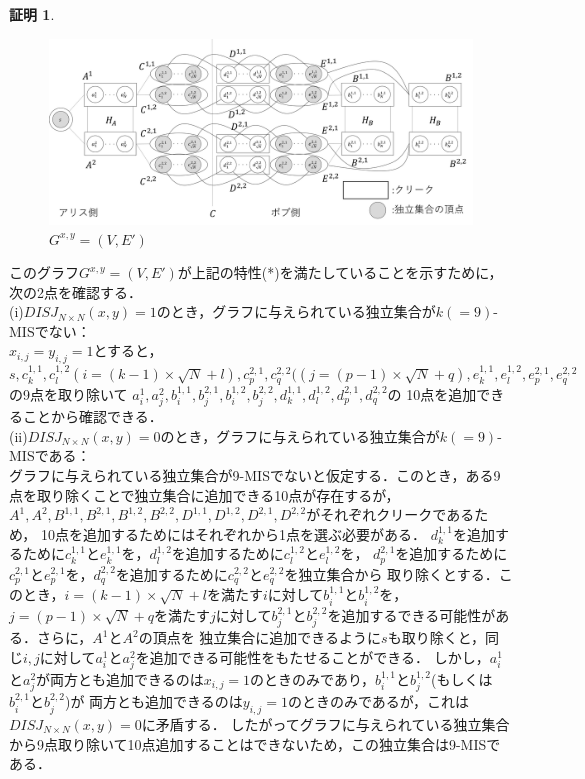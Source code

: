\documentclass[12pt]{thesis}
\theoremstyle{definition}
\newtheorem*{prf*}{証明}
\begin{document}
\begin{prf*}
\begin{figure}[ht]
\begin{center}
\includegraphics[width=120mm]{k_Gxy.png}
\end{center}
\caption{$G^{x, y} = (V, E')$}
\label{k_Gxy}
\end{figure}

このグラフ$G^{x, y} = (V, E')$が上記の特性(*)を満たしていることを示すために，次の2点を確認する． \\
(i)$DISJ_{N \times N} (x, y) = 1$のとき，グラフに与えられている独立集合が$k( = 9)$-MISでない： \\
$x_{i, j} = y_{i, j} =1$とすると，$s, c_{k}^{1,1}, c_{l}^{1,2}(i = (k - 1) \times \sqrt{N} + l),
 c_{p}^{2,1}, c_{q}^{2,2}((j = (p - 1) \times \sqrt{N} + q), 
 e_{k}^{1,1}, e_{l}^{1,2}, e_{p}^{2,1}, e_{q}^{2,2}$の9点を取り除いて
 $a_{i}^{1}, a_{j}^{2}, b_{i}^{1,1}, b_{j}^{2,1}, b_{i}^{1,2}, b_{j}^{2,2}, d_{k}^{1,1}, d_{l}^{1,2}, d_{p}^{2,1}, d_{q}^{2,2}$の
10点を追加できることから確認できる． \\
(ii)$DISJ_{N \times N} (x, y) = 0$のとき，グラフに与えられている独立集合が$k( = 9)$-MISである： \\ 
グラフに与えられている独立集合が9-MISでないと仮定する．このとき，ある9点を取り除くことで独立集合に追加できる10点が存在するが， \\
$A^{1}, A^{2}, B^{1,1}, B^{2,1}, B^{1,2}, B^{2,2}, D^{1,1}, D^{1,2}, D^{2,1}, D^{2,2}$がそれぞれクリークであるため，
10点を追加するためにはそれぞれから1点を選ぶ必要がある．
$d_{k}^{1,1}$を追加するために$c_{k}^{1,1}$と$e_{k}^{1,1}$を，$d_{l}^{1,2}$を追加するために$c_{l}^{1,2}$と$e_{l}^{1,2}$を，
$d_{p}^{2,1}$を追加するために$c_{p}^{2,1}$と$e_{p}^{2,1}$を，$d_{q}^{2,2}$を追加するために$c_{q}^{2,2}$と$e_{q}^{2,2}$を独立集合から
取り除くとする．このとき，$i = (k - 1) \times \sqrt{N} + l$を満たす$i$に対して$b_{i}^{1,1}$と$b_{i}^{1,2}$を，
$j = (p - 1) \times \sqrt{N} + q$を満たす$j$に対して$b_{j}^{2,1}$と$b_{j}^{2,2}$を追加するできる可能性がある．さらに，$A^{1}$と$A^{2}$の頂点を
独立集合に追加できるように$s$も取り除くと，同じ$i, j$に対して$a_{i}^{1}$と$a_{j}^{2}$を追加できる可能性をもたせることができる．
しかし，$a_{i}^{1}$と$a_{j}^{2}$が両方とも追加できるのは$x_{i, j} = 1$のときのみであり，$b_{i}^{1,1}$と$b_{j}^{1,2}$(もしくは$b_{i}^{2,1}$と$b_{j}^{2,2}$)が
両方とも追加できるのは$y_{i, j} = 1$のときのみであるが，これは$DISJ_{N \times N} (x, y) = 0$に矛盾する．
したがってグラフに与えられている独立集合から9点取り除いて10点追加することはできないため，この独立集合は9-MISである．


\end{prf*}
\end{document}
